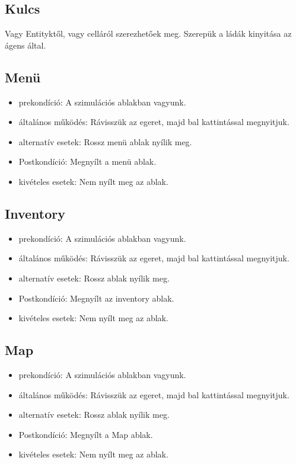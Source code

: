 \subsection{Kulcs}

Vagy Entityktől, vagy celláról szerezhetőek meg.
Szerepük a ládák kinyitása az ágens által.


\subsection{Menü}

\begin{itemize}
    \item prekondíció: A szimulációs ablakban vagyunk.
    \item általános működés: Rávisszük az egeret, majd bal kattintással megnyitjuk.
    \item alternatív esetek: Rossz menü ablak nyílik meg.
    \item Postkondíció: Megnyílt a menü ablak.
    \item kivételes esetek: Nem nyílt meg az ablak.
\end{itemize}

\subsection{Inventory}

\begin{itemize}
    \item prekondíció: A szimulációs ablakban vagyunk.
    \item általános működés: Rávisszük az egeret, majd bal kattintással megnyitjuk.
    \item alternatív esetek: Rossz ablak nyílik meg.
    \item Postkondíció: Megnyílt az inventory ablak.
    \item kivételes esetek: Nem nyílt meg az ablak.
\end{itemize}

\subsection{Map}

\begin{itemize}
    \item prekondíció: A szimulációs ablakban vagyunk.
    \item általános működés: Rávisszük az egeret, majd bal kattintással megnyitjuk.
    \item alternatív esetek: Rossz ablak nyílik meg.
    \item Postkondíció: Megnyílt a Map ablak.
    \item kivételes esetek: Nem nyílt meg az ablak.
\end{itemize}

